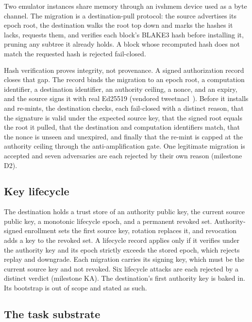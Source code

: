 \documentclass[10pt,twocolumn]{article}
\begin{document}
Two emulator instances share memory through an ivshmem device used as a byte
channel. The migration is a destination-pull protocol: the source advertises its
epoch root, the destination walks the root top down and marks the hashes it
lacks, requests them, and verifies each block's BLAKE3 hash before installing it,
pruning any subtree it already holds. A block whose recomputed hash does not match
the requested hash is rejected fail-closed.

Hash verification proves integrity, not provenance. A signed authorization record
closes that gap. The record binds the migration to an epoch root, a computation
identifier, a destination identifier, an authority ceiling, a nonce, and an
expiry, and the source signs it with real Ed25519 (vendored
tweetnacl~\cite{bernstein2012nacl,bernstein2012ed25519}). Before it installs and
re-mints, the destination checks, each fail-closed with a distinct reason, that
the signature is valid under the expected source key, that the signed root equals
the root it pulled, that the destination and computation identifiers match, that
the nonce is unseen and unexpired, and finally that the re-mint is capped at the
authority ceiling through the anti-amplification gate. One legitimate migration is
accepted and seven adversaries are each rejected by their own reason (milestone
D2).

\subsection{Key lifecycle}

The destination holds a trust store of an authority public key, the current
source public key, a monotonic lifecycle epoch, and a permanent revoked set.
Authority-signed enrollment sets the first source key, rotation replaces it, and
revocation adds a key to the revoked set. A lifecycle record applies only if it
verifies under the authority key and its epoch strictly exceeds the stored epoch,
which rejects replay and downgrade. Each migration carries its signing key, which
must be the current source key and not revoked. Six lifecycle attacks are each
rejected by a distinct verdict (milestone KA). The destination's first authority
key is baked in. Its bootstrap is out of scope and stated as such.

\subsection{The task substrate}
\end{document}
